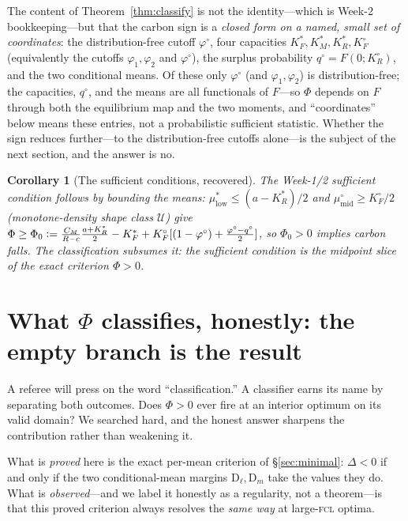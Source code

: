 \documentclass[11pt,reqno]{amsart}
\theoremstyle{plain}
\newtheorem{corollary}{Corollary}
\theoremstyle{definition}
\theoremstyle{remark}
\theoremstyle{remark}\newtheorem{observation}{Observation}
\newcommand{\KRs}{K_R^{*}}\newcommand{\KFs}{K_F^{*}}\newcommand{\KMs}{K_M^{*}}
\newcommand{\KRo}{K_R^{\circ}}\newcommand{\KFo}{K_F^{\circ}}
\newcommand{\Ucal}{\mathcal U}\newcommand{\fossil}{\mathrm{fossil}}
\newcommand{\mustar}{\mu^{*}_{\mathrm{low}}}\newcommand{\mumid}{\mu^{\circ}_{\mathrm{mid}}}
\newcommand{\phio}{\varphi^{\circ}}\newcommand{\qo}{q^{\circ}}
\begin{document}
The content of Theorem~\ref{thm:classify} is not the identity---which is Week-2
bookkeeping---but that the carbon sign is a \emph{closed form on a named, small set of
coordinates}: the distribution-free cutoff $\phio$, four capacities
$\KFs,\KMs,\KRs,\KFo$ (equivalently the cutoffs $\varphi_1,\varphi_2$ and $\phio$), the
surplus probability $\qo=F(0;\KRo)$, and the two conditional means. Of these only $\phio$
(and $\varphi_1,\varphi_2$) is distribution-free; the capacities, $\qo$, and the means are
all functionals of $F$---so $\Phi$ depends on $F$ through both the equilibrium map and the
two moments, and ``coordinates'' below means these entries, not a probabilistic sufficient
statistic. Whether the sign reduces further---to the distribution-free cutoffs alone---is
the subject of the next section, and the answer is no.

\begin{corollary}[The sufficient conditions, recovered]\label{cor:suff}
The Week-1/2 sufficient condition follows by bounding the means:
$\mustar\le(a-\KRs)/2$ and $\mumid\ge\KFo/2$ (monotone-density shape class $\Ucal$) give
$\Phi\ge\Phi_0\eqdef\tfrac{\CM}{R-c}\tfrac{a+\KRs}{2}-\KFs+\KFo[(1-\phio)+\tfrac{\phio-\qo}{2}]$,
so $\Phi_0>0$ implies carbon falls. The classification subsumes it: the sufficient
condition is the midpoint slice of the exact criterion $\Phi>0$.
\end{corollary}

\section{What $\Phi$ classifies, honestly: the empty branch is the result}\label{sec:emptybranch}

A referee will press on the word ``classification.'' A classifier earns its name by
separating both outcomes. Does $\Phi>0$ ever fire at an interior optimum on its valid domain?
We searched hard, and the honest answer sharpens the contribution rather than weakening it.

What is \emph{proved} here is the exact per-mean criterion of \S\ref{sec:minimal}: $\Delta<0$
if and only if the two conditional-mean margins $\mathrm{D}_\ell,\mathrm{D}_m$ take the values
they do. What is \emph{observed}---and we label it honestly as a regularity, not a theorem---is
that this proved criterion always resolves the \emph{same way} at large-\textsc{fcl} optima.
\end{document}
